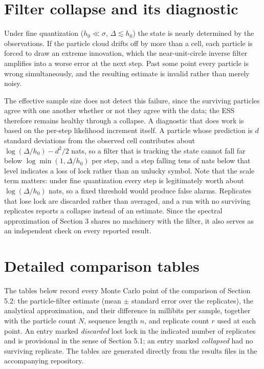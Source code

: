 \documentclass[11pt]{article}
\begin{document}
\section{Filter collapse and its diagnostic}\label{filter-collapse-and-its-diagnostic}

Under fine quantization (\(h_0 \ll \sigma\), \(\Delta \lesssim h_0\)) the state is nearly determined by the observations. If the particle cloud drifts off by more than a cell, each particle is forced to draw an extreme innovation, which the near-unit-circle inverse filter amplifies into a worse error at the next step. Past some point every particle is wrong simultaneously, and the resulting estimate is invalid rather than merely noisy.

The effective sample size does not detect this failure, since the surviving particles agree with one another whether or not they agree with the data; the ESS therefore remains healthy through a collapse. A diagnostic that does work is based on the per-step likelihood increment itself. A particle whose prediction is \(d\) standard deviations from the observed cell contributes about \(\log(\Delta/h_0) - d^2/2\) nats, so a filter that is tracking the state cannot fall far below \(\log\min(1, \Delta/h_0)\) per step, and a step falling tens of nats below that level indicates a loss of lock rather than an unlucky symbol. Note that the scale term matters: under fine quantization every step is legitimately worth about \(\log(\Delta/h_0)\) nats, so a fixed threshold would produce false alarms. Replicates that lose lock are discarded rather than averaged, and a run with no surviving replicates reports a collapse instead of an estimate. Since the spectral approximation of Section 3 shares no machinery with the filter, it also serves as an independent check on every reported result.

\section{Detailed comparison tables}\label{detailed-comparison-tables}

The tables below record every Monte Carlo point of the comparison of Section 5.2: the particle-filter estimate (mean $\pm$ standard error over the replicates), the analytical approximation, and their difference in millibits per sample, together with the particle count $N$, sequence length $n$, and replicate count $r$ used at each point. An entry marked \emph{discarded} lost lock in the indicated number of replicates and is provisional in the sense of Section 5.1; an entry marked \emph{collapsed} had no surviving replicate. The tables are generated directly from the results files in the accompanying repository.
\end{document}
